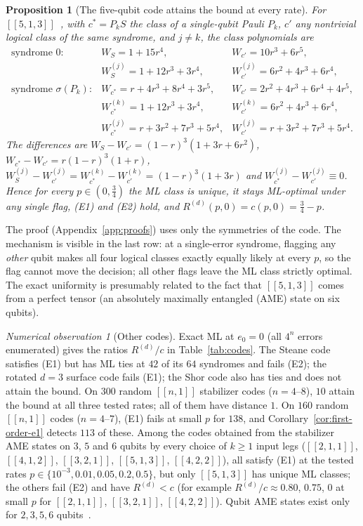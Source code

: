 \documentclass[11pt,a4paper]{article}
\theoremstyle{plain}
\newtheorem{proposition}[theorem]{Proposition}
\theoremstyle{definition}
\theoremstyle{remark}
\newtheorem{observation}[theorem]{Numerical observation}
\begin{document}
\begin{proposition}[The five-qubit code attains the bound at every rate]\label{prop:five-hand}
For $[[5,1,3]]$~\cite{LMPZ,BDSW}, with $c^\ast=P_kS$ the class of a single-qubit Pauli $P_k$, $c'$ any nontrivial logical class of the same syndrome, and $j\ne k$, the class polynomials are
\[
\begin{array}{lll}
\text{syndrome }0: & W_S=1+15r^4, & W_{c'}=10r^3+6r^5,\\
& W^{(j)}_S=1+12r^3+3r^4, & W^{(j)}_{c'}=6r^2+4r^3+6r^4,\\
\text{syndrome }\sigma(P_k): & W_{c^\ast}=r+4r^3+8r^4+3r^5, & W_{c'}=2r^2+4r^3+6r^4+4r^5,\\
& W^{(k)}_{c^\ast}=1+12r^3+3r^4, & W^{(k)}_{c'}=6r^2+4r^3+6r^4,\\
& W^{(j)}_{c^\ast}=r+3r^2+7r^3+5r^4, & W^{(j)}_{c'}=r+3r^2+7r^3+5r^4.
\end{array}
\]
The differences are $W_S-W_{c'}=(1-r)^3(1+3r+6r^2)$, $W_{c^\ast}-W_{c'}=r(1-r)^3(1+r)$, $W^{(j)}_S-W^{(j)}_{c'}=W^{(k)}_{c^\ast}-W^{(k)}_{c'}=(1-r)^3(1+3r)$ and $W^{(j)}_{c^\ast}-W^{(j)}_{c'}\equiv0$. Hence for every $p\in(0,\tfrac34)$ the ML class is unique, it stays ML-optimal under any single flag, (E1) and (E2) hold, and $R^{(d)}(p,0)=c(p,0)=\tfrac34-p$.
\end{proposition}

\noindent The proof (Appendix~\ref{app:proofs}) uses only the symmetries of the code. The mechanism is visible in the last row: at a single-error syndrome, flagging any \emph{other} qubit makes all four logical classes exactly equally likely at every $p$, so the flag cannot move the decision; all other flags leave the ML class strictly optimal. The exact uniformity is presumably related to the fact that $[[5,1,3]]$ comes from a perfect tensor (an absolutely maximally entangled (AME) state on six qubits).

\begin{observation}[Other codes]\label{obs:codes}
Exact ML at $e_0=0$ (all $4^n$ errors enumerated) gives the ratios $R^{(d)}/c$ in Table~\ref{tab:codes}. The Steane code~\cite{Steane} satisfies (E1) but has ML ties at $42$ of its $64$ syndromes and fails (E2); the rotated $d=3$ surface code fails (E1); the Shor code also has ties and does not attain the bound. On $300$ random $[[n,1]]$ stabilizer codes ($n=4$--$8$), $10$ attain the bound at all three tested rates; all of them have distance $1$. On $160$ random $[[n,1]]$ codes ($n=4$--$7$), (E1) fails at small $p$ for $138$, and Corollary~\ref{cor:first-order-e1} detects $113$ of these. Among the codes obtained from the stabilizer AME states on $3$, $5$ and $6$ qubits by every choice of $k\ge1$ input legs ($[[2,1,1]]$, $[[4,1,2]]$, $[[3,2,1]]$, $[[5,1,3]]$, $[[4,2,2]]$), all satisfy (E1) at the tested rates $p\in\{10^{-3},0.01,0.05,0.2,0.5\}$, but only $[[5,1,3]]$ has unique ML classes; the others fail (E2) and have $R^{(d)}<c$ (for example $R^{(d)}/c\approx0.80$, $0.75$, $0$ at small $p$ for $[[2,1,1]]$, $[[3,2,1]]$, $[[4,2,2]]$). Qubit AME states exist only for $2,3,5,6$ qubits~\cite{HiguchiSudbery,Scott,HGS}.
\end{observation}
\end{document}
